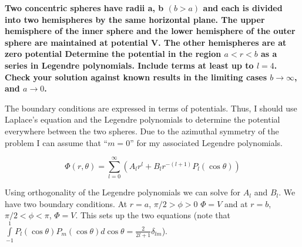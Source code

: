 \begin{homeworkProblem}[Jackson 3rd ed. : 3.1]
\textbf{Two concentric spheres have radii a, b $(b > a)$ and each is divided into two hemispheres by the same horizontal plane. The upper hemisphere of the inner sphere and the lower hemisphere of the outer sphere are maintained at potential V. The other hemispheres are at zero potential Determine the potential in the region $a < r < b$ as a series in Legendre polynomials. Include terms at least up to $l = 4$. Check your solution against known results in the limiting cases $b \rightarrow \infty$, and $a \rightarrow 0$. } \\
\par
The boundary conditions are expressed in terms of potentials. Thus, I should use Laplace's equation and the Legendre polynomials to determine the potential everywhere between the two spheres. Due to the azimuthal symmetry of the problem I can assume that ``$m = 0$'' for my associated Legendre polynomials.

\[
\Phi(r,\theta) = \sum\limits_{l = 0}^{\infty} \left( A_l r^l + B_l r^{-(l+1)} P_l(\cos\theta) \right)
\]

Using orthogonality of the Legendre polynomials we can solve for $A_l$ and $B_l$. We have two boundary conditions. At $r = a$, $\pi/2>\phi>0$ $\Phi = V$ and at $r = b$, $\pi/2<\phi<\pi$, $\Phi = V$. This sets up the two equations (note that $\int\limits_{-1}^1 P_l(\cos \theta)P_m(\cos \theta) d\cos\theta = \frac{2}{2l + 1} \delta_{l m}$). 


\end{homeworkProblem}
